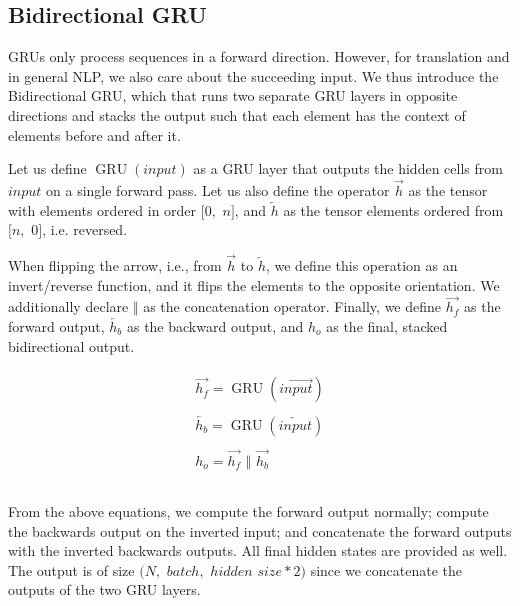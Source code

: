 \documentclass[twoside,twocolumn]{article}
\begin{document}
\subsection{Bidirectional GRU}
\label{sec:bidirectional}

GRUs only process sequences in a forward direction. However, for
translation and in general NLP, we also care about the succeeding input.
We thus introduce the Bidirectional GRU, which that runs two separate GRU
layers in opposite directions and stacks the output such that each element has
the context of elements before and after it.

Let us define $\operatorname{GRU}(input)$ as a GRU layer that outputs the
hidden cells from $input$ on a single forward pass. Let us also define the
operator $\overrightarrow{h}$ as the tensor with elements ordered in
order $[0,$ $n]$, and $\overleftarrow{h}$ as the tensor elements ordered
from $[n,$ $0]$, i.e. reversed.

When flipping the arrow, i.e., from $\overrightarrow{h}$ to
$\overleftarrow{h}$, we define this operation as an invert/reverse
function, and it flips the elements to the opposite orientation. We
additionally declare $\Vert$ as the concatenation operator. Finally, we
define $\overrightarrow{h_f}$ as the forward output, $\overleftarrow{h_b}$
as the backward output, and $h_o$ as the final, stacked bidirectional output.

\begin{equation}
  \label{eq:bidirectional}
  \begin{split}
    \begin{array}{ll}
      \overrightarrow{h_f} = \operatorname{GRU}(\overrightarrow{input})\\
      \\
      \overleftarrow{h_b} = \operatorname{GRU}(\overleftarrow{input})\\
      \\
      h_o = \overrightarrow{h_f} \,\,\Vert \,\, \overrightarrow{h_b}\\
      \\
    \end{array}
  \end{split}
\end{equation}

From the above equations, we compute the forward output normally;
compute the backwards output on the inverted input; and concatenate
the forward outputs with the inverted backwards outputs. All final
hidden states are provided as well. The output is of
size $(N,$ $batch,$ $hidden$ $size*2)$ since we concatenate the
outputs of the two GRU layers.
\end{document}
